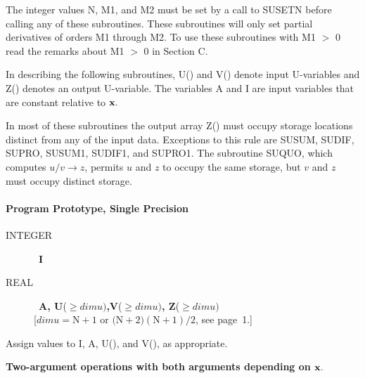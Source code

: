 \documentclass[twoside]{MATH77}
\begin{document}
The integer values N, M1, and M2 must be set by a call to SUSETN
before calling any of these subroutines.  These subroutines will only set
partial derivatives of orders M1 through M2.  To use these subroutines
with M1 $>$ 0 read the remarks about M1 $>$ 0 in Section C.

In describing the following subroutines, U() and V() denote input
U-variables and Z() denotes an output U-variable. The variables A and I are
input variables that are constant relative to ${\bf x}.$

In most of these subroutines the output array Z() must occupy storage
locations distinct from any of the input data. Exceptions to this rule are
SUSUM, SUDIF, SUPRO, SUSUM1, SUDIF1, and SUPRO1. The subroutine SUQUO, which
computes $u/v \rightarrow z$, permits $u$ and $z$ to occupy the same
storage, but $v$ and $z$ must occupy distinct storage.

\paragraph{Program Prototype, Single Precision}

\begin{description}
\item[INTEGER]  \ {\bf I}

\item[REAL]  \ {\bf A, U}($\geq dimu)${\bf ,V}($\geq dimu)${\bf , Z}($\geq
dimu)$\\
{[$dimu = \text{N}+1 \text{ or (N}+2)(\text{N}+1)/2$, see page~1.]}
\end{description}

Assign values to I, A, U(), and V(), as appropriate.

\begin{center}
{\bf Two-argument operations with both arguments depending on ${\bf x}.$}

\end{center}
\end{document}
